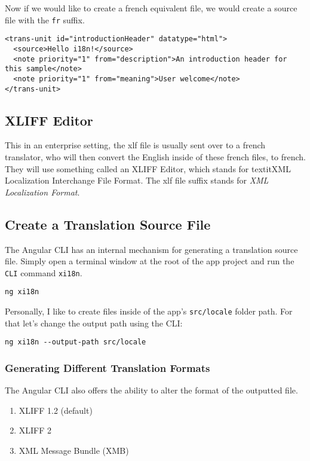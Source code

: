 Now if we would like to create a french equivalent file, we would create a source file with the \lstinline{fr} suffix. 

\begin{lstlisting}[caption=src/locale/messages.fr.xlf]
<trans-unit id="introductionHeader" datatype="html">
  <source>Hello i18n!</source>
  <note priority="1" from="description">An introduction header for this sample</note>
  <note priority="1" from="meaning">User welcome</note>
</trans-unit>
\end{lstlisting}

\subsection{XLIFF Editor}
This in an enterprise setting, the xlf file is usually sent over to a french translator, who will then convert the English inside of these french files, to french. They will use something called an XLIFF Editor, which stands for textit{XML Localization Interchange File Format}. The xlf file suffix stands for 
\textit{XML Localization Format}.

\subsection{Create a Translation Source File}
The Angular CLI has an internal mechanism for generating a translation source file. Simply open a terminal window at the root of the app project and run the 
\lstinline{CLI} command \lstinline{xi18n}.
\begin{verbatim}
ng xi18n 
\end{verbatim}

Personally, I like to create files inside of the app's \lstinline{src/locale} 
folder path. For that let's change the output path using the CLI: 
\begin{verbatim}
ng xi18n --output-path src/locale  
\end{verbatim}

\subsubsection{Generating Different Translation Formats}
The Angular CLI also offers the ability to alter the format of the outputted 
file. 
\begin{enumerate}
  \item XLIFF 1.2 (default)
  \item XLIFF 2
  \item XML Message Bundle (XMB)
\end{enumerate}

